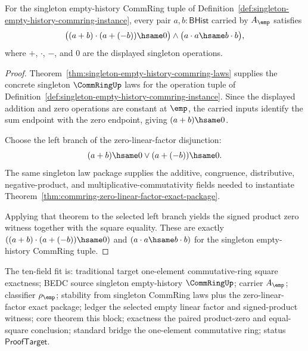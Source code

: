 \begin{theorem}
\label{thm:commring-singleton-empty-square-exact-package}
For the singleton empty-history CommRing tuple of
Definition~\ref{def:singleton-empty-history-commring-instance}, every pair
$a,b:\mathsf{BHist}$ carried by $A_{\emp}$ satisfies
$$
\bigl((a+b)\cdot(a+(-b))\hsame0\bigr)\land
\bigl(a\cdot a\hsame b\cdot b\bigr),
$$
where $+$, $\cdot$, $-$, and $0$ are the displayed singleton operations.
\end{theorem}
\begin{proof}
Theorem~\ref{thm:singleton-empty-history-commring-laws} supplies the concrete
singleton $\CommRingUp$ laws for the operation tuple of
Definition~\ref{def:singleton-empty-history-commring-instance}. Since the
displayed addition and zero operations are constant at $\emp$, the carried
inputs identify the sum endpoint with the zero endpoint, giving
$(a+b)\hsame0$.

Choose the left branch of the zero-linear-factor disjunction:
$$
(a+b)\hsame0 \lor (a+(-b))\hsame0 .
$$
The same singleton law package supplies the additive, congruence,
distributive, negative-product, and multiplicative-commutativity fields needed
to instantiate Theorem~\ref{thm:commring-zero-linear-factor-exact-package}.

Applying that theorem to the selected left branch yields the signed product
zero witness together with the square equality. These are exactly
$((a+b)\cdot(a+(-b))\hsame0)$ and $(a\cdot a\hsame b\cdot b)$ for the
singleton empty-history CommRing tuple.
\end{proof}

The ten-field fit is: traditional target one-element commutative-ring square
exactness; BEDC source singleton empty-history $\CommRingUp$; carrier
$A_{\emp}$; classifier $\rho_{\emp}$; stability from singleton CommRing laws
plus the zero-linear-factor exact package; ledger the selected empty linear
factor and signed-product witness; core theorem this block; exactness the
paired product-zero and equal-square conclusion; standard bridge the
one-element commutative ring; status $\mathsf{ProofTarget}$.

